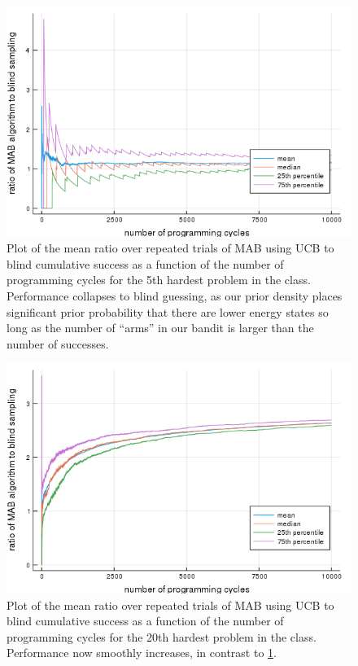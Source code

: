 \begin{figure}
    \includegraphics[width=0.8\columnwidth]{thompson_inst1_air.png}
    \caption{Plot of the mean ratio over repeated trials of MAB using UCB to blind cumulative success as a function of the number of programming cycles for the 5th hardest problem in the class. Performance collapses to blind guessing, as our prior density places significant prior probability that there are lower energy states so long as the number of ``arms'' in our bandit is larger than the number of successes.}
    \label{fig:thompson_inst1_air}
\end{figure}

\begin{figure}
    \includegraphics[width=0.8\columnwidth]{thompson_inst6_air.png}
    \caption{Plot of the mean ratio over repeated trials of MAB using UCB to blind cumulative success as a function of the number of programming cycles for the 20th hardest problem in the class. Performance now smoothly increases, in contrast to \ref{fig:thompson_inst1_air}.}
    \label{fig:thompson_inst6_air}
\end{figure}

